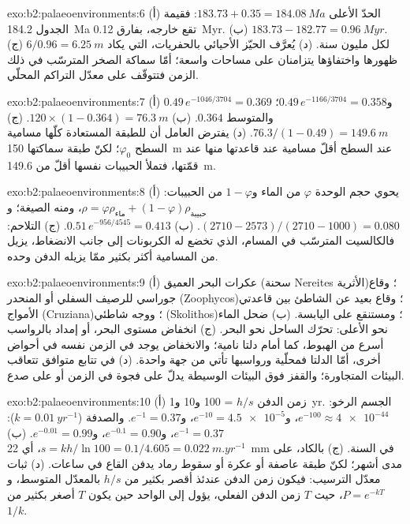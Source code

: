 \begin{solution}{exo:b2:palaeoenvironments:6}
(أ) الحدّ الأعلى $183.73 + 0.35 = \qty{184.08}{Ma}$: فقيمة الجدول \qty{184.2}{Ma} تقع
خارجه، بفارق \qty{0.12}{Myr}. (ب) $183.73 - 182.77 = \qty{0.96}{Myr}$. (ج) $6/0.96 =
\qty{6.25}{m}$ لكل مليون سنة. (د) يُعرَّف الحيّز الأحيائي بالحفريات، التي يكاد ظهورها
واختفاؤها يتزامنان على مساحات واسعة؛ أمّا سماكة الصخر المترسّب في
ذلك الزمن فتتوقّف على معدّل التراكم المحلّي.
\end{solution}

\begin{solution}{exo:b2:palaeoenvironments:7}
(أ) $0.49\,e^{-1046/3704} = 0.369$ و$0.49\,e^{-1166/3704} = 0.358$؛ والمتوسط $0.364$. (ب) $120
\times (1 - 0.364) = \qty{76.3}{m}$. (ج) $76.3/(1 - 0.49) = \qty{149.6}{m}$. (د) يفترض العامل
أن للطبقة المستعادة كلّها مسامية السطح $\varphi_0$؛ لكنّ طبقة
سماكتها \qty{150}{m} عند السطح أقلّ مسامية عند قاعدتها منها عند قمّتها، فتملأ الحبيبات نفسها
أقلّ من \qty{149.6}{m}.
\end{solution}

\begin{solution}{exo:b2:palaeoenvironments:8}
(أ) يحوي حجم الوحدة $\varphi$ من الماء و$1 - \varphi$ من الحبيبات: $\rho = \varphi
\rho_{\text{ماء}} + (1 - \varphi)\rho_{\text{حبيبة}}$، ومنه الصيغة؛ و$(2710 -
2573)/(2710 - 1000) = 0.080$. (ب) $0.51\,e^{-956/4545} = 0.413$. (ج) التلاحم: فالكالسيت
المترسّب في المسام، الذي تخضع له الكربونات إلى جانب الانضغاط، يزيل من المسامية أكثر بكثير
ممّا يزيله الدفن وحده.
\end{solution}

\begin{solution}{exo:b2:palaeoenvironments:9}
(أ) عكرات البحر العميق (سحنة Nereites الأثرية)؛ وقاع جوراسي للرصيف السفلي أو المنحدر
(Zoophycos)؛ وقاع بعيد عن الشاطئ بين قاعدتي الأمواج (Cruziana)؛ ووجه شاطئي (Skolithos)؛
ومستنقع على اليابسة. (ب) ضحل الماء نحو الأعلى: تحرّك الساحل نحو البحر. (ج) انخفاض مستوى البحر،
أو إمداد بالرواسب أسرع من الهبوط، كما أمام دلتا نامية؛ والانخفاض
يوجد في الزمن نفسه في أحواض أخرى، أمّا الدلتا فمحلّية ورواسبها تأتي
من جهة واحدة. (د) في تتابع متوافق تتعاقب البيئات المتجاورة؛ والقفز
فوق البيئات الوسيطة يدلّ على فجوة في الزمن أو على صدع.
\end{solution}

\begin{solution}{exo:b2:palaeoenvironments:10}
(أ) زمن الدفن $h/s$ = 100 و10 و\qty{1}{yr}. الجسم الرخو: $e^{-100} \approx
\num{4e-44}$، و$e^{-10} = \num{4.5e-5}$، و$e^{-1} = 0.37$. والصدفة ($k = \qty{0.01}{yr^{-1}}$):
$e^{-1} = 0.37$، و$e^{-0.1} = 0.90$، و$e^{-0.01} = 0.99$. (ب) $s = kh/\ln 100 = 0.1/4.605 =
\qty{0.022}{m.yr^{-1}}$، أي \qty{22}{mm} في السنة. (ج) بالكاد، على مدى أشهر؛ لكنّ طبقة عاصفة أو
عكرة أو سقوط رماد يدفن القاع في ساعات. (د) ثبات معدّل الترسيب: فيكون
زمن الدفن عندئذ أقصر بكثير من $h/s$ بالمعدّل المتوسط، و$P = e^{-kT}$، حيث $T$
زمن الدفن الفعلي، يؤول إلى الواحد حين يكون $T$ أصغر بكثير من $1/k$.
\end{solution}

